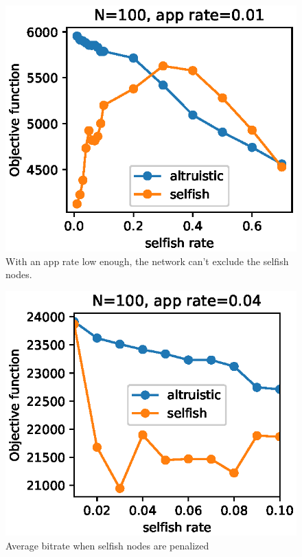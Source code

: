 \documentclass[conference,10.5pt]{IEEEtran}
\begin{document}
\begin{figure}
  \includegraphics{figures/obj_func_vs_selfish_rate_parabola.eps}
  \caption{With an app rate low enough, the network can't exclude the selfish nodes.}
  \label{fig:parabola}
\end{figure}

\begin{figure}[h]
  \includegraphics{figures/obj_func_vs_selfish_rate_selfish_degrade.eps}
  \caption{Average bitrate when selfish nodes are penalized}
  \label{fig:selfish-rate}
\end{figure}
\end{document}
